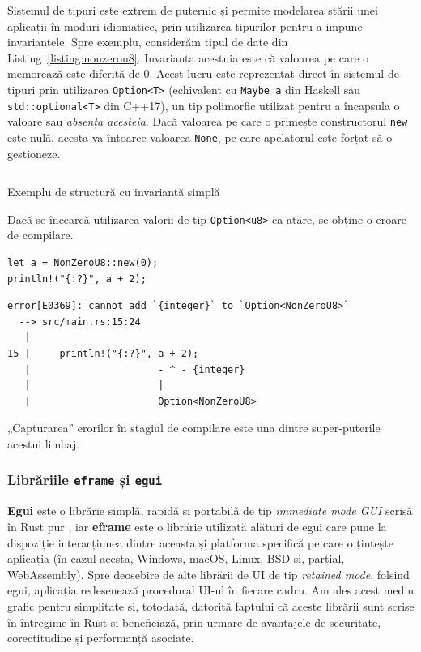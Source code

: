 \documentclass[a4paper]{article}
\begin{document}
Sistemul de tipuri este extrem de puternic și permite modelarea stării unei aplicații în moduri idiomatice, prin utilizarea tipurilor
pentru a impune invariantele. Spre exemplu, considerăm tipul de date din Listing~\ref{listing:nonzerou8}. Invarianta acestuia este
că valoarea pe care o memorează este diferită de 0. Acest lucru este reprezentat direct în sistemul de tipuri prin utilizarea
\texttt{Option<T>} (echivalent cu \texttt{Maybe a} din Haskell sau \texttt{std::optional<T>} din C++17), un tip polimorfic utilizat
pentru a încapsula o valoare sau \textit{absența acesteia}. Dacă valoarea pe care o primește constructorul \texttt{new} este nulă,
acesta va întoarce valoarea \texttt{None}, pe care apelatorul este forțat să o gestioneze.

\begin{listing}
	\inputminted{rust}{codeblocks/nonzerou8.rs}
	\caption{Exemplu de structură cu invariantă simplă}
	\label{listing:nonzerou8}
\end{listing}

Dacă se încearcă utilizarea valorii de tip \texttt{Option<u8>} ca atare, se obține o eroare de compilare.

\begin{verbatim}
let a = NonZeroU8::new(0);
println!("{:?}", a + 2);
\end{verbatim}
\begin{verbatim}
error[E0369]: cannot add `{integer}` to `Option<NonZeroU8>`
  --> src/main.rs:15:24
   |
15 |     println!("{:?}", a + 2);
   |                      - ^ - {integer}
   |                      |
   |                      Option<NonZeroU8>
\end{verbatim}

„Capturarea” erorilor în stagiul de compilare este una dintre super-puterile acestui limbaj.

\subsubsection{Librăriile \texttt{eframe} și \texttt{egui}}
\textbf{Egui} este o librărie simplă, rapidă și portabilă de tip \textit{immediate mode GUI} scrisă în Rust pur \cite{egui}, iar
\textbf{eframe} este o librărie utilizată alături de egui care pune la dispoziție interacțiunea dintre aceasta și platforma specifică
pe care o țintește aplicația (în cazul acesta, Windows, macOS, Linux, BSD și, parțial, WebAssembly). Spre deosebire de alte librării
de UI de tip \textit{retained mode}, folsind egui, aplicația redesenează procedural UI-ul în fiecare cadru. Am ales acest mediu
grafic pentru simplitate și, totodată, datorită faptului că aceste librării sunt scrise în întregime în Rust și beneficiază, prin urmare
de avantajele de securitate, corectitudine și performanță asociate.
\end{document}
